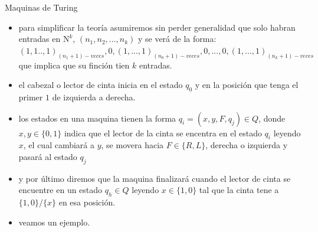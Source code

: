 \documentclass{beamer}
\begin{document}
\begin{frame}{Maquinas de Turing}
    \begin{itemize}
        \item para simplificar la teoría asumiremos sin perder generalidad que solo habran entradas en $\mathrm{N}^k$, $(n_1,n_2,...,n_k)$ y se verá de la forma: $(1,1..,1)_{(n_1+1)-veces},0,(1,...,1)_{(n_0+1)-veces},0,...,0,(1,...,1)_{(n_k+1)-veces}$
        que implica que su finción tien $k$ entradas.\pause
        \item el cabezal o lector de cinta inicia en el estado $q_0$ y en la posición que tenga el primer $1$ de izquierda a derecha.\pause
        \item los estados en una maquina tienen la forma $q_i=(x,y,F,q_j)\in Q$, donde $x,y\in\{0,1\}$ indica que el lector de la cinta se encentra en el estado $q_i$ leyendo $x$, el cual cambiará a $y$, se movera hacia $F\in\{R,L\}$, derecha o izquierda y pasará al estado $q_j$\pause
        \item y por último diremos que la maquina finalizará cuando el lector de cinta se encuentre en un estado $q_h\in Q$ leyendo $x\in\{1,0\}$ tal que la cinta tene a $\{1,0\}/\{x\}$ en esa posición.\\
        \item veamos un ejemplo.
    \end{itemize}
\end{frame}
\end{document}
